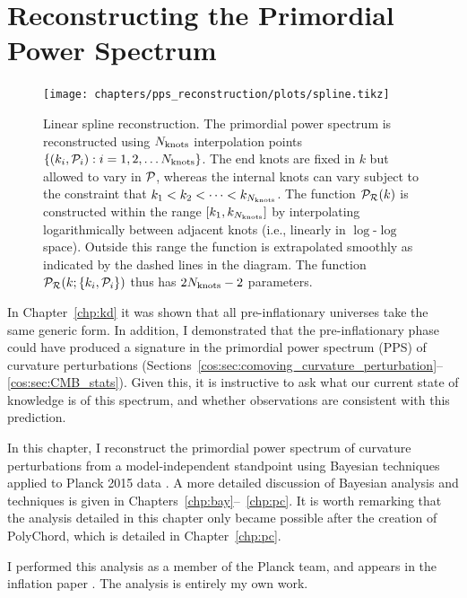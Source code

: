 \chapter[PPS reconstruction]{Reconstructing the Primordial Power Spectrum}
\label{chp:rec}

\begin{figure}[tp]
    \texttt{[image: chapters/pps\_reconstruction/plots/spline.tikz]}
  \caption{%
    Linear spline reconstruction. The primordial power spectrum is reconstructed using \(N_\mathrm{knots}\) interpolation points \({\{(k_i,\mathcal{P}_{i}):i=1,2,\ldots {N_\mathrm{knots}}\}}\). The end knots are fixed in \(k\) but allowed to vary in \({\mathcal{P}_{}}\), whereas the internal knots can vary subject to the constraint that \({k_1<k_2<\cdots<k_{N_\mathrm{knots}}}\).  The function \(\mathcal{P}_{\mathcal{R}}(k)\) is constructed within the range \([k_1,k_{N_\mathrm{knots}}]\) by interpolating logarithmically between adjacent knots (i.e., linearly in \(\log\)-\(\log\) space). Outside this range the function is extrapolated smoothly as indicated by the dashed lines in the diagram.  The function \(\mathcal{P}_{\mathcal{R}}(k;\{k_i,\mathcal{P}_{i}\})\) thus has \(2N_\mathrm{knots}-2\) parameters.  }\label{fig:linear_spline_reconstruction}
\end{figure}

In Chapter~\ref{chp:kd} it was shown that all pre-inflationary universes take the same generic form. In addition, I demonstrated that the pre-inflationary phase could have produced a signature in the primordial power spectrum (PPS) of curvature perturbations (Sections~\ref{cos:sec:comoving_curvature_perturbation}--\ref{cos:sec:CMB_stats}). Given this, it is instructive to ask what our current state of knowledge is of this spectrum, and whether observations are consistent with this prediction.

In this chapter, I reconstruct the primordial power spectrum of curvature perturbations from a model-independent standpoint using Bayesian techniques applied to Planck 2015 data \citep{planck2015-a1}. A more detailed discussion of Bayesian analysis and techniques is given in Chapters~\ref{chp:bay}--~\ref{chp:pc}. It is worth remarking that the analysis detailed in this chapter only became possible after the creation of PolyChord, which is detailed in Chapter~\ref{chp:pc}. 

I performed this analysis as a member of the Planck team, and appears in the inflation paper \citep{planck2015-a24}. The analysis is entirely my own work.

